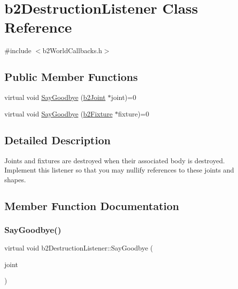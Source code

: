 \hypertarget{classb2_destruction_listener}{}\section{b2\+Destruction\+Listener Class Reference}
\label{classb2_destruction_listener}


{\ttfamily \#include $<$b2\+World\+Callbacks.\+h$>$}

\subsection*{Public Member Functions}
\begin{DoxyCompactItemize}
\item 
virtual void \hyperlink{classb2_destruction_listener_a6cd15baa6e5c33118cf7173ab5bf6d58}{Say\+Goodbye} (\hyperlink{classb2_joint}{b2\+Joint} $\ast$joint)=0
\item 
virtual void \hyperlink{classb2_destruction_listener_ab327c0073d162112c38d2fe8f8b9fce3}{Say\+Goodbye} (\hyperlink{classb2_fixture}{b2\+Fixture} $\ast$fixture)=0
\end{DoxyCompactItemize}


\subsection{Detailed Description}
Joints and fixtures are destroyed when their associated body is destroyed. Implement this listener so that you may nullify references to these joints and shapes. 

\subsection{Member Function Documentation}
\mbox{\label{classb2_destruction_listener_a6cd15baa6e5c33118cf7173ab5bf6d58}} 
\subsubsection{\texorpdfstring{Say\+Goodbye()}{SayGoodbye()}\hspace{0.1cm}{\footnotesize\ttfamily [1/2]}}
{\footnotesize\ttfamily virtual void b2\+Destruction\+Listener\+::\+Say\+Goodbye (\begin{DoxyParamCaption}\item[{\hyperlink{classb2_joint}{b2\+Joint} $\ast$}]{joint }\end{DoxyParamCaption})\hspace{0.3cm}{\ttfamily [pure virtual]}}

